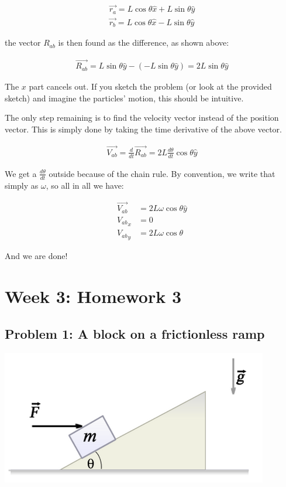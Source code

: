 \documentclass[12pt,a4paper]{report}
\begin{document}
\begin{align}
\vec{r_a} = L \cos \theta \hat{x} + L \sin \theta \hat{y}\\
\vec{r_b} = L \cos \theta \hat{x} - L \sin \theta \hat{y}
\end{align}

the vector $R_{ab}$ is then found as the difference, as shown above:

\begin{align}
\vec{R_{ab}} = L \sin \theta \hat{y} - (-L \sin \theta \hat{y}) = 2 L \sin \theta \hat{y}
\end{align}

The $x$ part cancels out. If you sketch the problem (or look at the provided sketch) and imagine the particles' motion, this should be intuitive.

The only step remaining is to find the velocity vector instead of the position vector. This is simply done by taking the time derivative of the above vector.

\begin{align}
\vec{V_{ab}} = \frac{d}{dt} \vec{R_{ab}} = 2 L \frac{d\theta}{dt} \cos \theta \hat{y}
\end{align}

We get a $\displaystyle \frac{d\theta}{dt}$ outside because of the chain rule. By convention, we write that simply as $\omega$, so all in all we have:

\begin{align}
\vec{V_{ab}} &= 2 L \omega \cos \theta \hat{y}\\
{V_{ab}}_x &= 0\\
{V_{ab}}_y &= 2 L \omega \cos \theta
\end{align}

And we are done!

\chapter{Week 3: Homework 3}

\section{Problem 1: A block on a frictionless ramp}

\begin{center}
\includegraphics[scale=0.65]{Graphics/h3p1}
\end{center}
\end{document}
